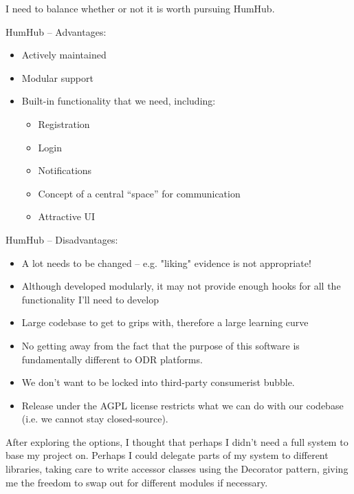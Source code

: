 I need to balance whether or not it is worth pursuing HumHub.

HumHub – Advantages:

\begin{itemize}
    \item Actively maintained
    \item Modular support
    \item Built-in functionality that we need, including:
    \begin{itemize}
        \item Registration
        \item Login
        \item Notifications
        \item Concept of a central “space” for communication
        \item Attractive UI
    \end{itemize}
\end{itemize}


HumHub – Disadvantages:

\begin{itemize}
    \item A lot needs to be changed – e.g. "liking" evidence is not appropriate!
    \item Although developed modularly, it may not provide enough hooks for all the functionality I'll need to develop
    \item Large codebase to get to grips with, therefore a large learning curve
    \item No getting away from the fact that the purpose of this software is fundamentally different to ODR platforms.
    \item We don't want to be locked into third-party consumerist bubble.
    \item Release under the AGPL license restricts what we can do with our codebase (i.e. we cannot stay closed-source).
\end{itemize}

After exploring the options, I thought that perhaps I didn't need a full system to base my project on. Perhaps I could delegate parts of my system to different libraries, taking care to write accessor classes using the Decorator pattern, giving me the freedom to swap out for different modules if necessary.
